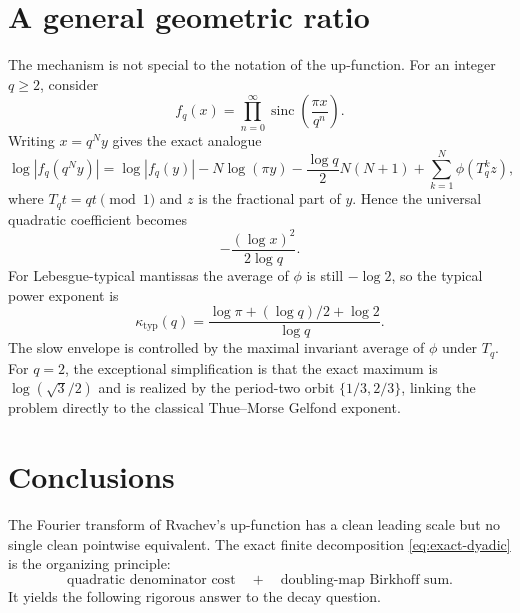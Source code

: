 \documentclass[11pt,oneside]{article}
\theoremstyle{definition}
\theoremstyle{remark}
\newcommand{\sinc}{\operatorname{sinc}}
\begin{document}
\section{A general geometric ratio}

The mechanism is not special to the notation of the up-function.  For an
integer $q\ge2$, consider
\begin{equation}
 f_q(x)=\prod_{n=0}^{\infty}
 \sinc\!\left(\frac{\pi x}{q^n}\right).                    \label{eq:fq}
\end{equation}
Writing $x=q^Ny$ gives the exact analogue
\begin{equation}
 \log|f_q(q^Ny)|
 =\log|f_q(y)|-N\log(\pi y)
 -\frac{\log q}{2}N(N+1)
 +\sum_{k=1}^{N}\phi(T_q^kz),                              \label{eq:q-decomp}
\end{equation}
where $T_qt=qt\pmod1$ and $z$ is the fractional part of $y$.  Hence the
universal quadratic coefficient becomes
\begin{equation}
 -\frac{(\log x)^2}{2\log q}.                              \label{eq:q-leading}
\end{equation}
For Lebesgue-typical mantissas the average of $\phi$ is still $-\log2$, so the
typical power exponent is
\begin{equation}
 \kappa_{\mathrm{typ}}(q)
 =\frac{\log\pi+(\log q)/2+\log2}{\log q}.                 \label{eq:q-typ}
\end{equation}
The slow envelope is controlled by the maximal invariant average of $\phi$
under $T_q$.  For $q=2$, the exceptional simplification is that the exact
maximum is $\log(\sqrt3/2)$ and is realized by the period-two orbit
$\{1/3,2/3\}$, linking the problem directly to the classical Thue--Morse
Gelfond exponent.

\section{Conclusions}

The Fourier transform of Rvachev's up-function has a clean leading scale but no
single clean pointwise equivalent.  The exact finite decomposition
\eqref{eq:exact-dyadic} is the organizing principle:
\begin{equation*}
 \text{quadratic denominator cost}
 \quad+\quad
 \text{doubling-map Birkhoff sum}.
\end{equation*}
It yields the following rigorous answer to the decay question.
\end{document}
